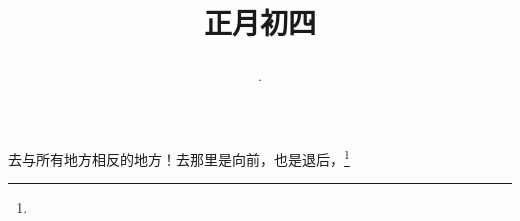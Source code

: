 \title{\date[d=13,m=2,y=2024][year:cn-y,年,month:cn,day:cn,日,·,weekday]·正月初四 }
去与所有地方相反的地方！去那里是向前，也是退后，\footnote{ }

